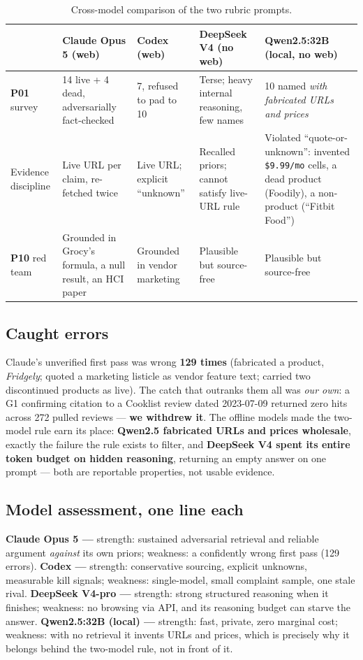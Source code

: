 \documentclass[sigconf,nonacm]{acmart}
\begin{document}
\begin{table}[t]\footnotesize\centering
\caption{Cross-model comparison of the two rubric prompts.}
\label{tab:xmodel}
\begin{tabular}{@{}p{1.9cm}p{3.5cm}p{3.4cm}p{3.4cm}p{3.4cm}@{}}
\toprule
& \textbf{Claude Opus 5} (web) & \textbf{Codex} (web) & \textbf{DeepSeek V4} (no web) & \textbf{Qwen2.5:32B} (local, no web) \\
\midrule
\textbf{P01} survey & 14 live + 4 dead, adversarially fact-checked & 7, refused to pad to 10 & Terse; heavy internal reasoning, few names & 10 named \emph{with fabricated URLs and prices} \\
Evidence discipline & Live URL per claim, re-fetched twice & Live URL; explicit ``unknown'' & Recalled priors; cannot satisfy live-URL rule & Violated ``quote-or-unknown'': invented \texttt{\$9.99/mo} cells, a dead product (Foodily), a non-product (``Fitbit Food'') \\
\textbf{P10} red team & Grounded in Grocy's formula, a null result, an HCI paper \cite{bansal2021} & Grounded in vendor marketing & Plausible but source-free & Plausible but source-free \\
\bottomrule
\end{tabular}
\end{table}

\subsection{Caught errors}
Claude's unverified first pass was wrong \textbf{129 times} (fabricated a product,
\emph{Fridgely}; quoted a marketing listicle as vendor feature text; carried two
discontinued products as live). The catch that outranks them all was \emph{our
own}: a G1 confirming citation to a Cooklist review dated 2023-07-09 returned zero
hits across 272 pulled reviews --- \textbf{we withdrew it}. The offline models made
the two-model rule earn its place: \textbf{Qwen2.5 fabricated URLs and prices
wholesale}, exactly the failure the rule exists to filter, and \textbf{DeepSeek V4
spent its entire token budget on hidden reasoning}, returning an empty answer on
one prompt --- both are reportable properties, not usable evidence.

\subsection{Model assessment, one line each}
\textbf{Claude Opus 5 --- }strength: sustained adversarial retrieval and reliable
argument \emph{against} its own priors; weakness: a confidently wrong first pass
(129 errors). \textbf{Codex --- }strength: conservative sourcing, explicit
unknowns, measurable kill signals; weakness: single-model, small complaint sample,
one stale rival. \textbf{DeepSeek V4-pro --- }strength: strong structured reasoning
when it finishes; weakness: no browsing via API, and its reasoning budget can
starve the answer. \textbf{Qwen2.5:32B (local) --- }strength: fast, private, zero
marginal cost; weakness: with no retrieval it invents URLs and prices, which is
precisely why it belongs behind the two-model rule, not in front of it.
\end{document}
